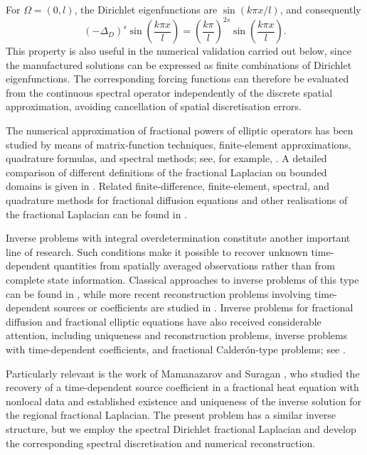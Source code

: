 \documentclass[reqno]{amsart}
\begin{document}
For $\Omega=(0,l)$, the Dirichlet eigenfunctions are
$\sin(k\pi x/l)$, and consequently
\[
 (-\Delta_D)^s
 \sin\!\left(\frac{k\pi x}{l}\right)
 =
 \left(\frac{k\pi}{l}\right)^{2s}
 \sin\!\left(\frac{k\pi x}{l}\right).
\]
This property is also useful in the numerical validation carried out below,
since the manufactured solutions can be expressed as finite combinations of
Dirichlet eigenfunctions. The corresponding forcing functions can therefore
be evaluated from the continuous spectral operator independently of the
discrete spatial approximation, avoiding cancellation of spatial
discretisation errors.

The numerical approximation of fractional powers of elliptic operators has
been studied by means of matrix-function techniques, finite-element
approximations, quadrature formulas, and spectral methods; see, for example,
\cite{BonitoPasciak15}. A detailed comparison of different definitions of the
fractional Laplacian on bounded domains is given in \cite{Lischke20}.
Related finite-difference, finite-element, spectral, and quadrature methods
for fractional diffusion equations and other realisations of the fractional
Laplacian can be found in
\cite{DWZ18,DZ19,GSZZ21,HW22,HO14,HS24,WZ22,YCYL25,
Acosta2017,Borthagaray19,CSW21,SWCL24,ZC24}.

Inverse problems with integral overdetermination constitute another important
line of research. Such conditions make it possible to recover unknown
time-dependent quantities from spatially averaged observations rather than
from complete state information. Classical approaches to inverse problems of
this type can be found in \cite{Prilepko2000}, while more recent
reconstruction problems involving time-dependent sources or coefficients are
studied in
\cite{Grim20,VanBock22,Hendy22,Karel22,DurdRah25}.
Inverse problems for fractional diffusion and fractional elliptic equations
have also received considerable attention, including uniqueness and
reconstruction problems, inverse problems with time-dependent coefficients,
and fractional Calder\'on-type problems; see
\cite{Helin20,Ghosh20,Guerngar21,Li23,Kow23,Sahoo23,Fujishiro16,Hazanee13,Hazanee14,Suragan24}.

Particularly relevant is the work of Mamanazarov and Suragan
\cite{Suragan25}, who studied the recovery of a time-dependent source
coefficient in a fractional heat equation with nonlocal data and established
existence and uniqueness of the inverse solution for the regional fractional
Laplacian. The present problem has a similar inverse structure, but we employ
the spectral Dirichlet fractional Laplacian and develop the corresponding
spectral discretisation and numerical reconstruction.
\end{document}
